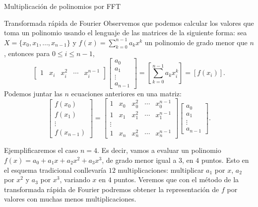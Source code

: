 \begin{chapter}{Multiplicación de polinomios por FFT}
\begin{section}{Transformada rápida de Fourier}
        Observemos que podemos calcular los valores que toma un polinomio usando el lenguaje de las matrices de la siguiente forma: sea $X = \{x_0, x_1, \ldots, x_{n-1}\}$ y $f(x) = \sum_{k=0}^{n-1} a_kx^k$ un polinomio de grado menor que $n$,  entonces para $0 \le i \le n-1$, 
        \begin{equation*}
            \begin{bmatrix}
                1 & x_i & x_i^2 & \cdots & x_i^{n-1}
            \end{bmatrix}
            \begin{bmatrix}
                a_0 \\a_1 \\ \vdots \\a_{n-1} 
            \end{bmatrix} = \left[ \sum_{k=0}^{n-1} a_kx_i^k\right] = [f(x_i)].
        \end{equation*}
        Podemos juntar las $n$ ecuaciones anteriores en una matriz:
        \begin{equation*}
            \begin{bmatrix}
                f(x_0) \\f(x_1) \\ \vdots \\f(x_{n-1}) 
            \end{bmatrix}
            = 
            \begin{bmatrix}
                1 & x_0 & x_0^2 & \cdots & x_0^{n-1} \\
                1 & x_1 & x_1^2 & \cdots & x_1^{n-1} \\ \vdots \\
                1 & x_n & x_n^2 & \cdots & x_n^{n-1} 
            \end{bmatrix}
            \begin{bmatrix}
                a_0 \\a_1 \\ \vdots \\a_{n-1} 
            \end{bmatrix}.
        \end{equation*}
    


        \begin{ejemplo*} Ejemplificaremos el caso $n=4$. Es  decir, vamos a evaluar un polinomio $f(x) = a_0 + a_1 x + a_2x^2 + a_3x^3$, de grado menor igual a  $3$, en $4$ puntos. Esto en el esquema tradicional conllevaría $12$ multiplicaciones: multiplicar $a_1$ por $x$,  $a_2$ por $x^2$ y $a_3$ por $x^3$, variando $x$  en $4$ puntos. Veremos que con el método  de la transformada rápida de Fourier podremos obtener la representación de $f$ por valores con muchas menos multiplicaciones. 
        

\end{ejemplo*}
\end{section}
\end{chapter}
